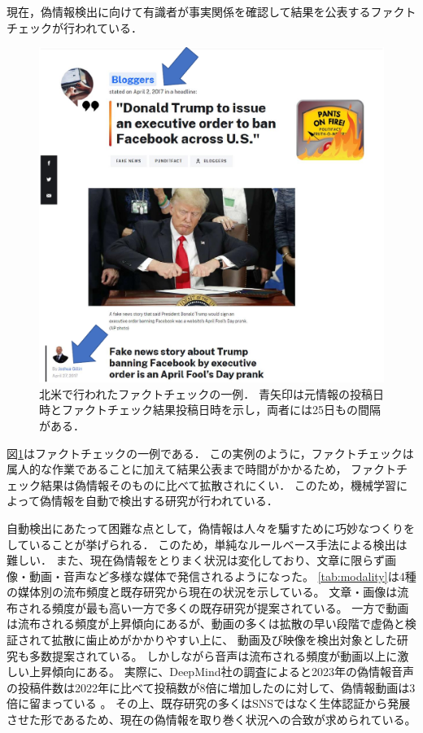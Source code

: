 現在，偽情報検出に向けて有識者が事実関係を確認して結果を公表するファクトチェックが行われている．
\begin{figure}[p]
    \centering
    \includegraphics[width=0.8\linewidth]{figures/fact-check.pdf}
    \caption{
        北米で行われたファクトチェックの一例．
        青矢印は元情報の投稿日時とファクトチェック結果投稿日時を示し，両者には25日もの間隔がある．
        }
    \label{fig:example}
\end{figure}

図\ref{fig:example}はファクトチェックの一例である\cite{gillin_2017}．
この実例のように，ファクトチェックは属人的な作業であることに加えて結果公表まで時間がかかるため，
ファクトチェック結果は偽情報そのものに比べて拡散されにくい．
このため，機械学習によって偽情報を自動で検出する研究が行われている．

自動検出にあたって困難な点として，偽情報は人々を騙すために巧妙なつくりをしていることが挙げられる．
このため，単純なルールベース手法による検出は難しい．
また、現在偽情報をとりまく状況は変化しており、文章に限らず画像・動画・音声など多様な媒体で発信されるようになった。
\cref{tab:modality}は4種の媒体別の流布頻度と既存研究から現在の状況を示している。
文章・画像は流布される頻度が最も高い一方で多くの既存研究が提案されている。
一方で動画は流布される頻度が上昇傾向にあるが、動画の多くは拡散の早い段階で虚偽と検証されて拡散に歯止めがかかりやすい上に、
動画及び映像を検出対象とした研究も多数提案されている。
しかしながら音声は流布される頻度が動画以上に激しい上昇傾向にある。
実際に、DeepMind社の調査によると2023年の偽情報音声の投稿件数は2022年に比べて投稿数が8倍に増加したのに対して、偽情報動画は3倍に留まっている \cite{Ulmer_Tong_2023}。
その上、既存研究の多くはSNSではなく生体認証から発展させた形であるため、現在の偽情報を取り巻く状況への合致が求められている。
% 

